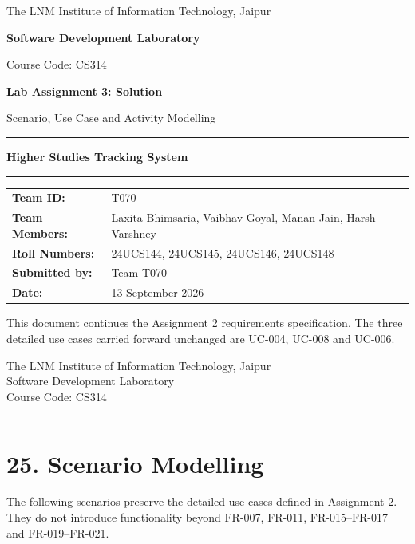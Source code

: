 \documentclass[12pt,a4paper]{article}
\newcommand{\docheader}{%
\begin{center}\small The LNM Institute of Information Technology, Jaipur\\
Software Development Laboratory\\Course Code: CS314\end{center}\vspace{-3pt}\hrule\vspace{10pt}}
\newcommand{\sectionnum}[1]{\section*{#1}}
\begin{document}
\begin{titlepage}
\centering
\vspace*{1.45cm}
{\large The LNM Institute of Information Technology, Jaipur\par}
\vspace{.35cm}
{\Large\bfseries Software Development Laboratory\par}
\vspace{.2cm}
{\large Course Code: CS314\par}
\vspace{1.5cm}
{\LARGE\bfseries Lab Assignment 3: Solution\par}
\vspace{.35cm}
{\Large Scenario, Use Case and Activity Modelling\par}
\vspace{1.35cm}
\rule{.85\textwidth}{.7pt}\par\vspace{.55cm}
{\large\bfseries Higher Studies Tracking System\par}
\vspace{.55cm}
\rule{.85\textwidth}{.7pt}\par
\vfill
\begin{tabular}{>{\bfseries}l l}
Team ID: & T070\\
Team Members: & Laxita Bhimsaria, Vaibhav Goyal, Manan Jain, Harsh Varshney\\
Roll Numbers: & 24UCS144, 24UCS145, 24UCS146, 24UCS148\\
Submitted by: & Team T070\\
Date: & 13 September 2026
\end{tabular}
\vfill
{\small This document continues the Assignment 2 requirements specification. The three detailed use cases carried forward unchanged are UC-004, UC-008 and UC-006.}\par
\end{titlepage}

\docheader
\sectionnum{25. Scenario Modelling}
The following scenarios preserve the detailed use cases defined in Assignment 2. They do not introduce functionality beyond FR-007, FR-011, FR-015--FR-017 and FR-019--FR-021.
\end{document}
